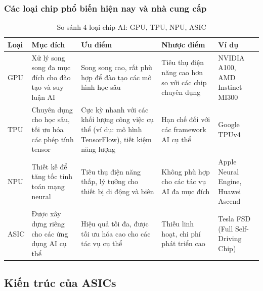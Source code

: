 \documentclass[a4paper]{article}
\begin{document}
\subsubsection{Các loại chip phổ biến hiện nay và nhà cung cấp}
\begin{table}[H]
    \centering
    \renewcommand{\arraystretch}{1.3} %
    \begin{tabular}{|l|p{3cm}|p{3cm}|p{2cm}|p{2cm}|}
        \hline
        \textbf{Loại} & \textbf{Mục đích} & \textbf{Ưu điểm} & \textbf{Nhược điểm} & \textbf{Ví dụ} \\
        \hline
        GPU & Xử lý song song đa mục đích cho đào tạo và suy luận AI & Song song cao, rất phù hợp để đào tạo các mô hình học sâu & Tiêu thụ điện năng cao hơn so với các chip chuyên dụng & NVIDIA A100, AMD Instinct MI300 \\
        \hline
        TPU & Chuyên dụng cho học sâu, tối ưu hóa các phép tính tensor & Cực kỳ nhanh với các khối lượng công việc cụ thể (ví dụ: mô hình TensorFlow), tiết kiệm năng lượng & Hạn chế đối với các framework AI cụ thể & Google TPUv4 \\
        \hline
        NPU & Thiết kế để tăng tốc tính toán mạng neural & Tiêu thụ điện năng thấp, lý tưởng cho thiết bị di động và biên & Không phù hợp cho các tác vụ AI đa mục đích & Apple Neural Engine, Huawei Ascend \\
        \hline
        ASIC & Được xây dựng riêng cho các ứng dụng AI cụ thể & Hiệu quả tối đa, được tối ưu hóa cao cho các tác vụ cụ thể & Thiếu linh hoạt, chi phí phát triển cao & Tesla FSD (Full Self-Driving Chip) \\
        \hline
    \end{tabular}
    \caption{So sánh 4 loại chip AI: GPU, TPU, NPU, ASIC}
    \label{tab:chip_comparison}
\end{table}
\subsection{Kiến trúc của ASICs}
\end{document}
